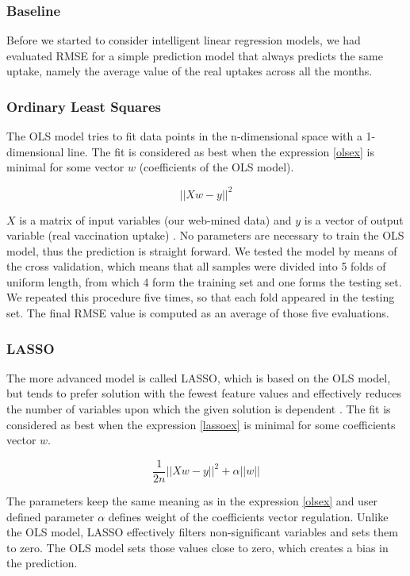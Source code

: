 \documentclass{sig-alternate}
\begin{document}
\subsubsection{Baseline}
Before we started to consider intelligent linear regression models, we had evaluated RMSE for a simple prediction model that always predicts the same uptake, namely the average value of the real uptakes across all the months.

\subsubsection{Ordinary Least Squares}
The OLS model tries to fit data points in the n-dimensional space with a 1-dimensional line.
The fit is considered as best when the expression \ref{olsex} is minimal for some vector $w$ (coefficients of the OLS model).

\begin{equation} \label{olsex}
  ||Xw - y||^2
\end{equation}

$X$ is a matrix of input variables (our web-mined data) and $y$ is a vector of output variable (real vaccination uptake) \cite{scikit}.
No parameters are necessary to train the OLS model, thus the prediction is straight forward.
We tested the model by means of the cross validation, which means that all samples were divided into 5 folds of uniform length, from which 4 form the training set and one forms the testing set.
We repeated this procedure five times, so that each fold appeared in the testing set.
The final RMSE value is computed as an average of those five evaluations.

\subsubsection{LASSO}
The more advanced model is called LASSO, which is based on the OLS model, but tends to prefer solution with the fewest feature values and effectively reduces the number of variables upon which the given solution is dependent \cite{scikit}.
The fit is considered as best when the expression \ref{lassoex} is minimal for some coefficients vector $w$.

\begin{equation} \label{lassoex}
  \frac{1}{2n}  ||Xw - y||^2 + \alpha ||w||
\end{equation}

The parameters keep the same meaning as in the expression \ref{olsex} and user defined parameter $\alpha$ defines weight of the coefficients vector regulation.
Unlike the OLS model, LASSO effectively filters non-significant variables and sets them to zero.
The OLS model sets those values close to zero, which creates a bias in the prediction.
\end{document}
